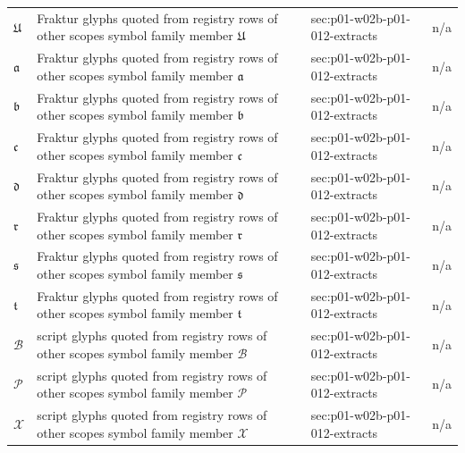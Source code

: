 \begin{longtable}{@{}p{}p{}p{}p{}@{}}
\(\mathfrak U\) & Fraktur glyphs quoted from registry rows of other scopes symbol family member \(\mathfrak U\) & sec:\allowbreak{}p01-\allowbreak{}w02b-\allowbreak{}p01-\allowbreak{}012-\allowbreak{}extracts & n/a \\
\(\mathfrak a\) & Fraktur glyphs quoted from registry rows of other scopes symbol family member \(\mathfrak a\) & sec:\allowbreak{}p01-\allowbreak{}w02b-\allowbreak{}p01-\allowbreak{}012-\allowbreak{}extracts & n/a \\
\(\mathfrak b\) & Fraktur glyphs quoted from registry rows of other scopes symbol family member \(\mathfrak b\) & sec:\allowbreak{}p01-\allowbreak{}w02b-\allowbreak{}p01-\allowbreak{}012-\allowbreak{}extracts & n/a \\
\(\mathfrak c\) & Fraktur glyphs quoted from registry rows of other scopes symbol family member \(\mathfrak c\) & sec:\allowbreak{}p01-\allowbreak{}w02b-\allowbreak{}p01-\allowbreak{}012-\allowbreak{}extracts & n/a \\
\(\mathfrak d\) & Fraktur glyphs quoted from registry rows of other scopes symbol family member \(\mathfrak d\) & sec:\allowbreak{}p01-\allowbreak{}w02b-\allowbreak{}p01-\allowbreak{}012-\allowbreak{}extracts & n/a \\
\(\mathfrak r\) & Fraktur glyphs quoted from registry rows of other scopes symbol family member \(\mathfrak r\) & sec:\allowbreak{}p01-\allowbreak{}w02b-\allowbreak{}p01-\allowbreak{}012-\allowbreak{}extracts & n/a \\
\(\mathfrak s\) & Fraktur glyphs quoted from registry rows of other scopes symbol family member \(\mathfrak s\) & sec:\allowbreak{}p01-\allowbreak{}w02b-\allowbreak{}p01-\allowbreak{}012-\allowbreak{}extracts & n/a \\
\(\mathfrak t\) & Fraktur glyphs quoted from registry rows of other scopes symbol family member \(\mathfrak t\) & sec:\allowbreak{}p01-\allowbreak{}w02b-\allowbreak{}p01-\allowbreak{}012-\allowbreak{}extracts & n/a \\
\(\mathscr B\) & script glyphs quoted from registry rows of other scopes symbol family member \(\mathscr B\) & sec:\allowbreak{}p01-\allowbreak{}w02b-\allowbreak{}p01-\allowbreak{}012-\allowbreak{}extracts & n/a \\
\(\mathscr P\) & script glyphs quoted from registry rows of other scopes symbol family member \(\mathscr P\) & sec:\allowbreak{}p01-\allowbreak{}w02b-\allowbreak{}p01-\allowbreak{}012-\allowbreak{}extracts & n/a \\
\(\mathscr X\) & script glyphs quoted from registry rows of other scopes symbol family member \(\mathscr X\) & sec:\allowbreak{}p01-\allowbreak{}w02b-\allowbreak{}p01-\allowbreak{}012-\allowbreak{}extracts & n/a \\

\end{longtable}

